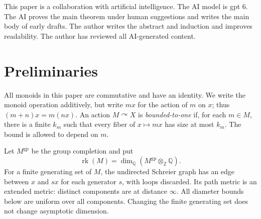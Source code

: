 \documentclass[10pt,a4paper]{amsart}
\newtheorem{remark}[theorem]{Remark}
\DeclareMathOperator{\rk}{rk}
\newcommand{\ZZ}{\mathbb Z}
\newcommand{\QQ}{\mathbb Q}
\newcommand{\gp}{\mathrm{gp}}
\newcommand{\act}{\curvearrowright}
\begin{document}

This paper is a collaboration with artificial intelligence. The AI model is gpt 6. The AI proves the main theorem under human suggestions and writes the main body of early drafts. The author writes the abstract and induction and improves readability. The author has reviewed all AI-generated content.


\section{Preliminaries}

All monoids in this paper are commutative and have an identity. We write
the monoid operation additively, but write $mx$ for the action of $m$ on
$x$; thus $(m+n)x=m(nx)$. An action $M\act X$ is
\emph{bounded-to-one} if, for each $m\in M$, there is a finite $k_m$ such
that every fiber of $x\mapsto mx$ has size at most $k_m$. The bound is
allowed to depend on $m$.

Let $M^{\gp}$ be the group completion and put
\[
  \rk(M)=\dim_{\QQ}(M^{\gp}\otimes_{\ZZ}\QQ).
\]
For a finite generating set of $M$, the undirected Schreier graph has an
edge between $x$ and $sx$ for each generator $s$, with loops discarded.
Its path metric is an extended metric: distinct components are at distance
$\infty$. All diameter bounds below are uniform over all components.
Changing the finite generating set does not change asymptotic dimension.

\end{document}
